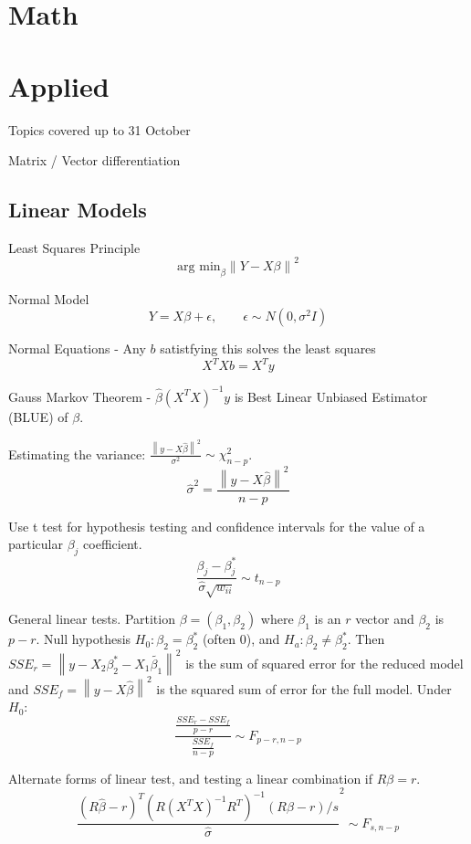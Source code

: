 \documentclass[12pt]{article}
\newcommand{\norm}[1]{\left\lVert#1\right\rVert}
\begin{document}
\section{Math}

\newpage

\section{Applied}

Topics covered up to 31 October

Matrix / Vector differentiation

\subsection{Linear Models}

Least Squares Principle
\[
    \text{arg min}_\beta \norm{Y - X\beta}^2
\]

Normal Model 
\[
    Y = X\beta + \epsilon, \qquad \epsilon \sim N(0, \sigma^2 I)
\]

Normal Equations - Any $b$ satistfying this solves the least squares
\[
    X^T X b = X^T y
\]

Gauss Markov Theorem - $\hat{\beta} (X^T X)^{-1} y$ is Best Linear Unbiased
Estimator (BLUE) of $\beta$.

Estimating the variance: $\frac{\norm{y - X \hat{\beta}}^2}{\sigma^2} \sim
\chi^2_{n-p}$.
\[
    \hat{\sigma}^2 = \frac{\norm{y - X \hat{\beta}}^2}{n - p}
\]

Use t test for hypothesis testing and confidence intervals for the value of
a particular $\beta_j$ coefficient.
\[
    \frac{\beta_j - \beta_j^*}{\hat{\sigma} \sqrt{w_{ii}}} \sim t_{n-p}
\]

General linear tests. Partition $\beta = (\beta_1, \beta_2)$ where $\beta_1$
is an $r$ vector and $\beta_2$ is $p - r$. Null hypothesis $H_0: \beta_2 =
\beta_2^*$ (often 0), and $H_a: \beta_2 \neq \beta_2^*$. Then
$SSE_r = \norm{y - X_2 \beta_2^* - X_1 \tilde{\beta_1}}^2$ is the sum of
squared error for the reduced model and 
$SSE_f = \norm{y - X \hat{\beta}}^2$ is the squared sum of error for the
full model.
Under $H_0$:
\[
    \frac{\frac{SSE_r - SSE_f}{p - r}}
         {\frac{SSE_f}{n - p}}
         \sim F_{p-r, n-p}
\]

Alternate forms of linear test, and testing a linear combination if $R\beta
= r$.
\[
    \frac{(R \hat{\beta} - r)^T (R(X^T X)^{-1} R^T)^{-1} (R \beta - r) / s}
    {\hat{\sigma}}^2 \sim F_{s, n-p}
\]
\end{document}
